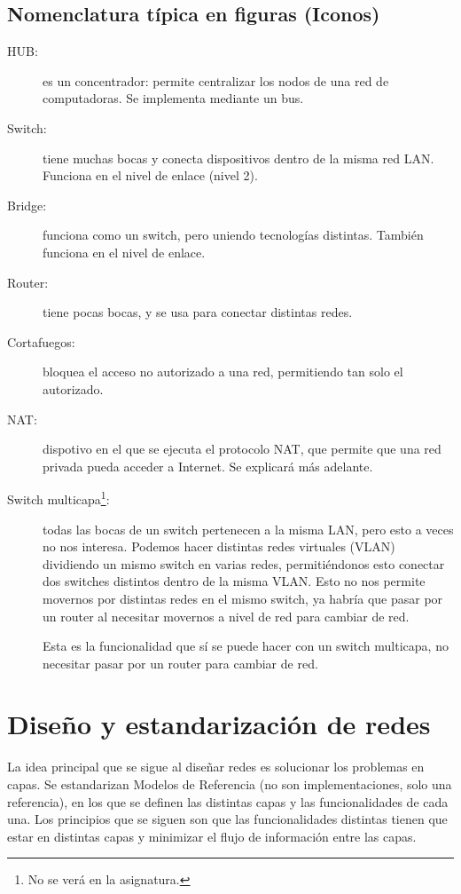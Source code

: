 \subsection{Nomenclatura típica en figuras (Iconos)}
\begin{description}
    \item[HUB:] es un concentrador: permite centralizar los nodos de una red de computadoras. Se implementa mediante un bus.
    \item[Switch:] tiene muchas bocas y conecta dispositivos dentro de la misma red \acrshort{LAN}. Funciona en el nivel de enlace (nivel 2).
    \item[Bridge:] funciona como un switch, pero uniendo tecnologías distintas. También funciona en el nivel de enlace.
    \item[Router:] tiene pocas bocas, y se usa para conectar distintas redes. 
    \item[Cortafuegos:] bloquea el acceso no autorizado a una red, permitiendo tan solo el autorizado. 
    \item[NAT:] dispotivo en el que se ejecuta el protocolo \acrfull{NAT}, que permite que una red privada pueda acceder a Internet. Se explicará más adelante.
    \item[Switch multicapa\footnote{No se verá en la asignatura.}:] todas las bocas de un switch pertenecen a la misma \acrshort{LAN}, pero esto a veces no nos interesa. Podemos hacer distintas redes virtuales (\acrshort{VLAN}) dividiendo un mismo switch en varias redes, permitiéndonos esto conectar dos switches distintos dentro de la misma \acrshort{VLAN}. Esto no nos permite movernos por distintas redes en el mismo switch, ya habría que pasar por un router al necesitar movernos a nivel de red para cambiar de red.
    
    Esta es la funcionalidad que sí se puede hacer con un switch multicapa, no necesitar pasar por un router para cambiar de red.
\end{description}

\section{Diseño y estandarización de redes}

La idea principal que se sigue al diseñar redes es solucionar los problemas en capas. Se estandarizan Modelos de Referencia (no son implementaciones, solo una referencia), en los que se definen las distintas capas y las funcionalidades de cada una. Los principios que se siguen son que las funcionalidades distintas tienen que estar en distintas capas y minimizar el flujo de información entre las capas.\\

